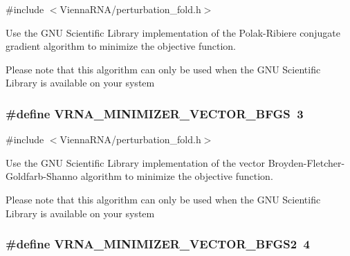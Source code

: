 {\ttfamily \#include $<$Vienna\-R\-N\-A/perturbation\-\_\-fold.\-h$>$}



Use the G\-N\-U Scientific Library implementation of the Polak-\/\-Ribiere conjugate gradient algorithm to minimize the objective function. 

Please note that this algorithm can only be used when the G\-N\-U Scientific Library is available on your system \hypertarget{group__soft__constraints_ga9be8a702cddf58235571ace11cc41b22}{
\subsubsection[{V\-R\-N\-A\-\_\-\-M\-I\-N\-I\-M\-I\-Z\-E\-R\-\_\-\-V\-E\-C\-T\-O\-R\-\_\-\-B\-F\-G\-S}]{\setlength{\rightskip}{0pt plus 5cm}\#define V\-R\-N\-A\-\_\-\-M\-I\-N\-I\-M\-I\-Z\-E\-R\-\_\-\-V\-E\-C\-T\-O\-R\-\_\-\-B\-F\-G\-S~3}}\label{group__soft__constraints_ga9be8a702cddf58235571ace11cc41b22}


{\ttfamily \#include $<$Vienna\-R\-N\-A/perturbation\-\_\-fold.\-h$>$}



Use the G\-N\-U Scientific Library implementation of the vector Broyden-\/\-Fletcher-\/\-Goldfarb-\/\-Shanno algorithm to minimize the objective function. 

Please note that this algorithm can only be used when the G\-N\-U Scientific Library is available on your system \hypertarget{group__soft__constraints_ga7b0a65c6c92fa1d8012383ba9d3dcb4f}{
\subsubsection[{V\-R\-N\-A\-\_\-\-M\-I\-N\-I\-M\-I\-Z\-E\-R\-\_\-\-V\-E\-C\-T\-O\-R\-\_\-\-B\-F\-G\-S2}]{\setlength{\rightskip}{0pt plus 5cm}\#define V\-R\-N\-A\-\_\-\-M\-I\-N\-I\-M\-I\-Z\-E\-R\-\_\-\-V\-E\-C\-T\-O\-R\-\_\-\-B\-F\-G\-S2~4}}\label{group__soft__constraints_ga7b0a65c6c92fa1d8012383ba9d3dcb4f}


